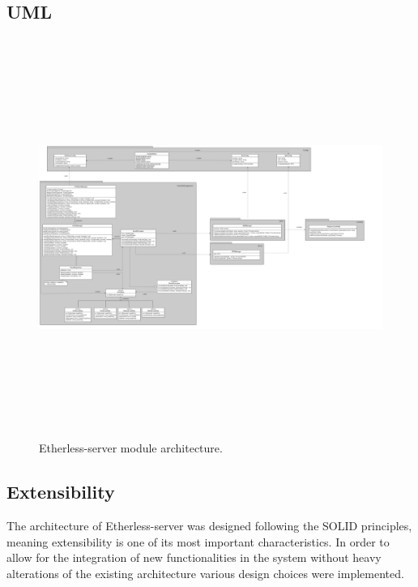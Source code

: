 	\begin{landscape}
	\subsection{UML}
		\begin{figure}[H]
			\includegraphics[width=24cm, height=13cm]{././diagrammi/etherless-server/Etherless-server-package-class.png}
			\caption{Etherless-server module architecture.}
		\end{figure}
	\end{landscape}
	\restoregeometry

	\subsection{Extensibility}  %
	The architecture of Etherless-server was designed following the SOLID principles, meaning extensibility is one of its most important characteristics. In order to allow for the integration of new functionalities in the system without heavy alterations of the existing architecture various design choices were implemented.
